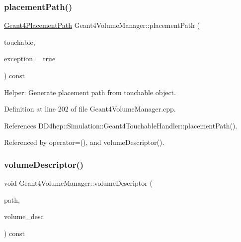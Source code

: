 \subsubsection{\texorpdfstring{placement\+Path()}{placementPath()}}
{\footnotesize\ttfamily \hyperlink{namespace_d_d4hep_1_1_simulation_1_1_geant4_geometry_maps_a8a325934adb143cb1cbc47dd030395ed}{Geant4\+Placement\+Path} Geant4\+Volume\+Manager\+::placement\+Path (\begin{DoxyParamCaption}\item[{const G4\+V\+Touchable $\ast$}]{touchable,  }\item[{bool}]{exception = {\ttfamily true} }\end{DoxyParamCaption}) const}



Helper\+: Generate placement path from touchable object. 



Definition at line 202 of file Geant4\+Volume\+Manager.\+cpp.



References D\+D4hep\+::\+Simulation\+::\+Geant4\+Touchable\+Handler\+::placement\+Path().



Referenced by operator=(), and volume\+Descriptor().

\hypertarget{class_d_d4hep_1_1_simulation_1_1_geant4_volume_manager_af7402b335d1b056c6e55e377adab9d73}{}\label{class_d_d4hep_1_1_simulation_1_1_geant4_volume_manager_af7402b335d1b056c6e55e377adab9d73} 
\subsubsection{\texorpdfstring{volume\+Descriptor()}{volumeDescriptor()}\hspace{0.1cm}{\footnotesize\ttfamily [1/2]}}
{\footnotesize\ttfamily void Geant4\+Volume\+Manager\+::volume\+Descriptor (\begin{DoxyParamCaption}\item[{const \hyperlink{class_d_d4hep_1_1_simulation_1_1_geant4_volume_manager_a990d8577e764541c4914263db1c6b0ca}{Placement\+Path} \&}]{path,  }\item[{\hyperlink{class_d_d4hep_1_1_simulation_1_1_geant4_volume_manager_aeedd11a516f671331ec2a46f5d39768d}{Vol\+I\+D\+Descriptor} \&}]{volume\+\_\+desc }\end{DoxyParamCaption}) const}



